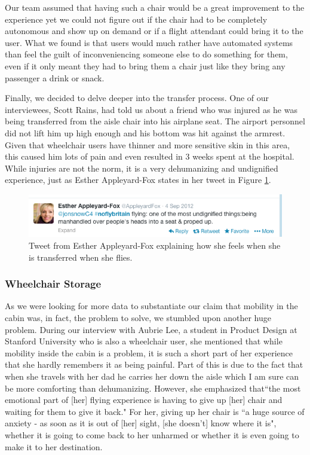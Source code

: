 Our team assumed that having such a chair would be a great improvement to the experience yet we could not figure out if the chair had to be completely autonomous and show up on demand or if a flight attendant could bring it to the user. What we found is that users would much rather have automated systems than feel the guilt of inconveniencing someone else to do something for them, even if it only meant they had to bring them a chair just like they bring any passenger a drink or snack. 

Finally, we decided to delve deeper into the transfer process. One of our interviewees, Scott Rains, had told us about a friend who was injured as he was being transferred from the aisle chair into his airplane seat. The airport personnel did not lift him up high enough and his bottom was hit against the armrest. Given that wheelchair users have thinner and more sensitive skin in this area, this caused him lots of pain and even resulted in 3 weeks spent at the hospital. While injuries are not the norm, it is a very dehumanizing and undignified experience, just as Esther Appleyard-Fox states in her tweet in Figure \ref{fig:MobilityTweet.png}. 


\begin{figure}[h]
  \centering
     \includegraphics[width=12cm]{images/MobilityTweet.png}
   \caption{Tweet from Esther Appleyard-Fox explaining how she feels when she is transferred when she flies. }
  \label{fig:MobilityTweet.png}
\end{figure}


\subsubsection{Wheelchair Storage}

As we were looking for more data to substantiate our claim that mobility in the cabin was, in fact, the problem to solve, we stumbled upon another huge problem. During our interview with Aubrie Lee, a student in Product Design at Stanford University who is also a wheelchair user, she mentioned that while mobility inside the cabin is a problem, it is such a short part of her experience that she hardly remembers it as being painful. Part of this is due to the fact that when she travels with her dad he carries her down the aisle which I am sure can be more comforting than dehumanizing. However, she emphasized that``the most emotional part of [her] flying experience is having to give up [her] chair and waiting for them to give it back." For her, giving up her chair is ``a huge source of anxiety - as soon as it is out of [her] sight, [she doesn't] know where it is", whether it is going to come back to her unharmed or whether it is even going to make it to her destination. 

